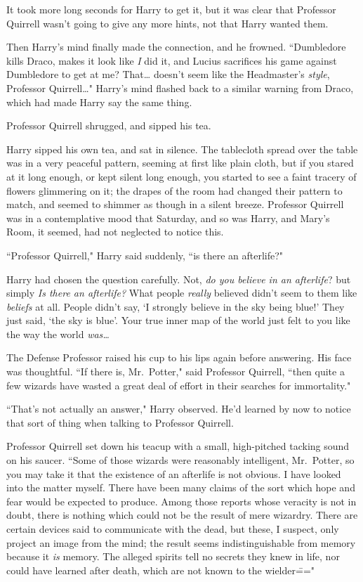 It took more long seconds for Harry to get it, but it was clear that Professor Quirrell wasn't going to give any more hints, not that Harry wanted them.

Then Harry's mind finally made the connection, and he frowned. ``Dumbledore kills Draco, makes it look like \emph{I} did it, and Lucius sacrifices his game against Dumbledore to get at me? That{\ldots} doesn't seem like the Headmaster's \emph{style}, Professor Quirrell{\ldots}" Harry's mind flashed back to a similar warning from Draco, which had made Harry say the same thing.

Professor Quirrell shrugged, and sipped his tea.

Harry sipped his own tea, and sat in silence. The tablecloth spread over the table was in a very peaceful pattern, seeming at first like plain cloth, but if you stared at it long enough, or kept silent long enough, you started to see a faint tracery of flowers glimmering on it; the drapes of the room had changed their pattern to match, and seemed to shimmer as though in a silent breeze. Professor Quirrell was in a contemplative mood that Saturday, and so was Harry, and Mary's Room, it seemed, had not neglected to notice this.

``Professor Quirrell," Harry said suddenly, ``is there an afterlife?"

Harry had chosen the question carefully. Not, \emph{do you believe in an afterlife}? but simply \emph{Is there an afterlife?} What people \emph{really} believed didn't seem to them like \emph{beliefs} at all. People didn't say, `I strongly believe in the sky being blue!' They just said, `the sky is blue'. Your true inner map of the world just felt to you like the way the world \emph{was{\ldots}}

The Defense Professor raised his cup to his lips again before answering. His face was thoughtful. ``If there is, Mr.~Potter," said Professor Quirrell, ``then quite a few wizards have wasted a great deal of effort in their searches for immortality."

``That's not actually an answer," Harry observed. He'd learned by now to notice that sort of thing when talking to Professor Quirrell.

Professor Quirrell set down his teacup with a small, high-pitched tacking sound on his saucer. ``Some of those wizards were reasonably intelligent, Mr.~Potter, so you may take it that the existence of an afterlife is not obvious. I have looked into the matter myself. There have been many claims of the sort which hope and fear would be expected to produce. Among those reports whose veracity is not in doubt, there is nothing which could not be the result of mere wizardry. There are certain devices said to communicate with the dead, but these, I suspect, only project an image from the mind; the result seems indistinguishable from memory because it \emph{is} memory. The alleged spirits tell no secrets they knew in life, nor could have learned after death, which are not known to the wielder\==="

